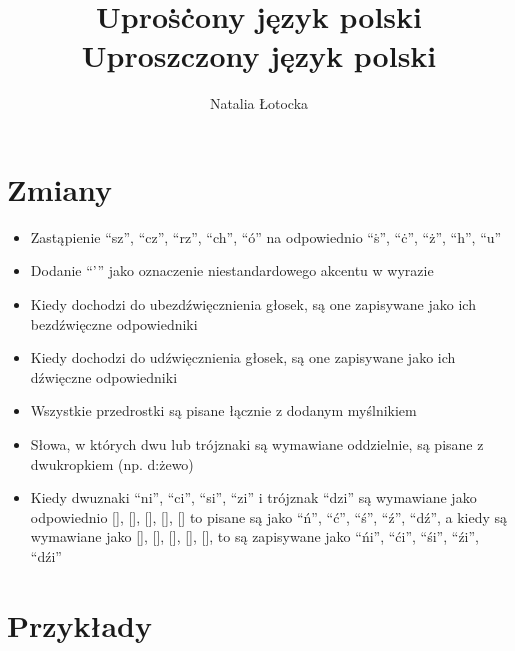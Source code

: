 \documentclass[polish,12pt]{article}
\begin{document}
\setmainfont{Doulos SIL}
\title{%
    Upro\.s\.cony język polski\\
    \large Uproszczony język polski}
\author{Natalia Łotocka}
\maketitle
\tableofcontents
\newpage
\section{Zmiany}
\begin{itemize}
    \item Zastąpienie \enquote{sz}, \enquote{cz}, \enquote{rz}, \enquote{ch}, \enquote{ó} na odpowiednio \enquote{\.s}, \enquote{\.c}, \enquote{ż}, \enquote{h}, \enquote{u}
    \item Dodanie \enquote{'} jako oznaczenie niestandardowego akcentu w wyrazie
    \item Kiedy dochodzi do ubezdźwięcznienia głosek, są one zapisywane jako ich bezdźwięczne odpowiedniki
    \item Kiedy dochodzi do udźwięcznienia głosek, są one zapisywane jako ich dźwięczne odpowiedniki
    \item Wszystkie przedrostki są pisane łącznie z dodanym myślnikiem
    \item Słowa, w których dwu lub trójznaki są wymawiane oddzielnie, są pisane z dwukropkiem (np. d:żewo)
    \item Kiedy dwuznaki \enquote{ni}, \enquote{ci}, \enquote{si}, \enquote{zi} i trójznak \enquote{dzi} są wymawiane jako odpowiednio [\textipa{\textltailn}], [], [], [\textipa{\textctz}], [] to pisane są jako \enquote{ń}, \enquote{ć}, \enquote{ś}, \enquote{ź}, \enquote{dź}, a kiedy są wymawiane jako [], [], [], [], [], to są zapisywane jako \enquote{ńi}, \enquote{ći}, \enquote{śi}, \enquote{źi}, \enquote{dźi}
\end{itemize}
\newpage
\section{Przykłady}
\end{document}
